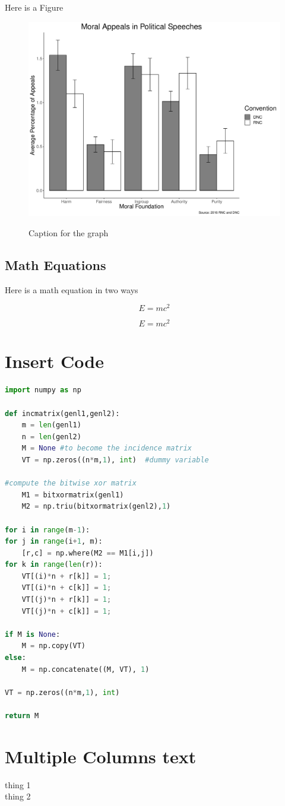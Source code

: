 \documentclass[12pt]{article}
\begin{document}
\noindent Here is a Figure

\begin{figure} [H]   
	\centering
	{	 \includegraphics[width=.7\textwidth]{graph}}
	\caption{Caption for the graph}\label{figure}
\end{figure}

\subsection{Math Equations}

Here is a math equation in two ways

\begin{equation}
E=mc^2
\end{equation}

\[E=mc^2\]

\section{Insert Code}

\begin{singlespace}
\begin{lstlisting}[language=Python]
import numpy as np

def incmatrix(genl1,genl2):
	m = len(genl1)
	n = len(genl2)
	M = None #to become the incidence matrix
	VT = np.zeros((n*m,1), int)  #dummy variable

#compute the bitwise xor matrix
	M1 = bitxormatrix(genl1)
	M2 = np.triu(bitxormatrix(genl2),1) 

for i in range(m-1):
for j in range(i+1, m):
	[r,c] = np.where(M2 == M1[i,j])
for k in range(len(r)):
	VT[(i)*n + r[k]] = 1;
	VT[(i)*n + c[k]] = 1;
	VT[(j)*n + r[k]] = 1;
	VT[(j)*n + c[k]] = 1;

if M is None:
	M = np.copy(VT)
else:
	M = np.concatenate((M, VT), 1)

VT = np.zeros((n*m,1), int)

return M
\end{lstlisting}
\end{singlespace}

\section{Multiple Columns text}

\begin{multicols}{2}
	thing 1 \\
	thing 2
\end{multicols}


\begin{singlespace}
	
	
\end{singlespace}
\end{document}
